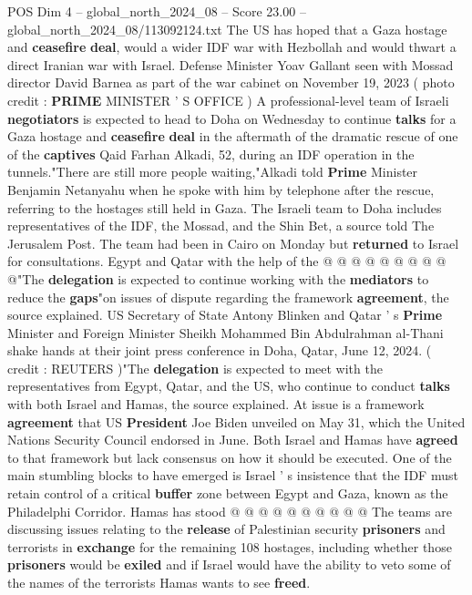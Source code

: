 \begin{textsample}{POS Dim 4 – global\_north\_2024\_08 – Score 23.00 – global\_north\_2024\_08/113092124.txt}  \label{ex:f4_pos_167}
The US has hoped that a Gaza hostage and \textbf{ceasefire} \textbf{deal}, would a wider IDF war with Hezbollah and would thwart a direct Iranian war with Israel.
Defense Minister Yoav Gallant seen with Mossad director David Barnea as part of the war cabinet on November 19, 2023 ( photo credit : \textbf{PRIME} MINISTER ' S OFFICE ) A professional-level team of Israeli \textbf{negotiators} is expected to head to Doha on Wednesday to continue \textbf{talks} for a Gaza hostage and \textbf{ceasefire} \textbf{deal} in the aftermath of the dramatic rescue of one of the \textbf{captives} Qaid Farhan Alkadi, 52, during an IDF operation in the tunnels."There are still more people waiting,"Alkadi told \textbf{Prime} Minister Benjamin Netanyahu when he spoke with him by telephone after the rescue, referring to the hostages still held in Gaza.
The Israeli team to Doha includes representatives of the IDF, the Mossad, and the Shin Bet, a source told The Jerusalem Post.
The team had been in Cairo on Monday but \textbf{returned} to Israel for consultations.
Egypt and Qatar with the help of the @ @ @ @ @ @ @ @ @ @"The \textbf{delegation} is expected to continue working with the \textbf{mediators} to reduce the \textbf{gaps}"on issues of dispute regarding the framework \textbf{agreement}, the source explained.
US Secretary of State Antony Blinken and Qatar ' s \textbf{Prime} Minister and Foreign Minister Sheikh Mohammed Bin Abdulrahman al-Thani shake hands at their joint press conference in Doha, Qatar, June 12, 2024. ( credit : REUTERS )"The \textbf{delegation} is expected to meet with the representatives from Egypt, Qatar, and the US, who continue to conduct \textbf{talks} with both Israel and Hamas, the source explained.
At issue is a framework \textbf{agreement} that US \textbf{President} Joe Biden unveiled on May 31, which the United Nations Security Council endorsed in June.
Both Israel and Hamas have \textbf{agreed} to that framework but lack consensus on how it should be executed.
One of the main stumbling blocks to have emerged is Israel ' s insistence that the IDF must retain control of a critical \textbf{buffer} zone between Egypt and Gaza, known as the Philadelphi Corridor.
Hamas has stood @ @ @ @ @ @ @ @ @ @ The teams are discussing issues relating to the \textbf{release} of Palestinian security \textbf{prisoners} and terrorists in \textbf{exchange} for the remaining 108 hostages, including whether those \textbf{prisoners} would be \textbf{exiled} and if Israel would have the ability to veto some of the names of the terrorists Hamas wants to see \textbf{freed}.

\end{textsample}
